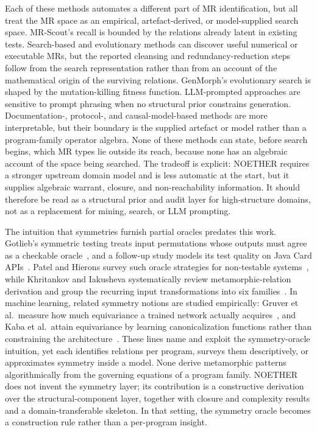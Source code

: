 \documentclass[acmsmall,screen,review]{acmart}
\begin{document}
Each of these methods automates a different part of MR identification, but all treat the MR space as an empirical, artefact-derived, or model-supplied search space. MR-Scout's recall is bounded by the relations already latent in existing tests. Search-based and evolutionary methods can discover useful numerical or executable MRs, but the reported cleansing and redundancy-reduction steps follow from the search representation rather than from an account of the mathematical origin of the surviving relations. GenMorph's evolutionary search is shaped by the mutation-killing fitness function. LLM-prompted approaches are sensitive to prompt phrasing when no structural prior constrains generation. Documentation-, protocol-, and causal-model-based methods are more interpretable, but their boundary is the supplied artefact or model rather than a program-family operator algebra. None of these methods can state, before search begins, which MR types lie outside its reach, because none has an algebraic account of the space being searched. The tradeoff is explicit: NOETHER requires a stronger upstream domain model and is less automatic at the start, but it supplies algebraic warrant, closure, and non-reachability information. It should therefore be read as a structural prior and audit layer for high-structure domains, not as a replacement for mining, search, or LLM prompting.

The intuition that symmetries furnish partial oracles predates this work. Gotlieb's symmetric testing treats input permutations whose outputs must agree as a checkable oracle~\cite{Gotlieb2003Symmetries}, and a follow-up study models its test quality on Java Card APIs~\cite{GotliebBernard2006}. Patel and Hierons survey such oracle strategies for non-testable systems~\cite{PatelHierons2018}, while Khritankov and Iakusheva systematically review metamorphic-relation derivation and group the recurring input transformations into six families~\cite{KhritankovIakusheva2024}. In machine learning, related symmetry notions are studied empirically: Gruver et al.\ measure how much equivariance a trained network actually acquires~\cite{Gruver2023LieDerivative}, and Kaba et al.\ attain equivariance by learning canonicalization functions rather than constraining the architecture~\cite{Kaba2023Canonicalization}. These lines name and exploit the symmetry-oracle intuition, yet each identifies relations per program, surveys them descriptively, or approximates symmetry inside a model. None derive metamorphic patterns algorithmically from the governing equations of a program family. NOETHER does not invent the symmetry layer; its contribution is a constructive derivation over the structural-component layer, together with closure and complexity results and a domain-transferable skeleton. In that setting, the symmetry oracle becomes a construction rule rather than a per-program insight.
\end{document}
